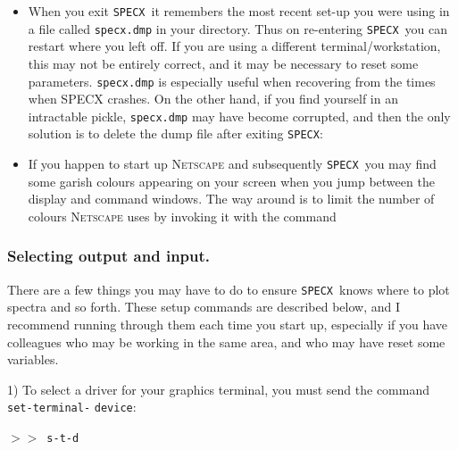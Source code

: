 \documentclass[11pt,twoside]{starlink}
\providecommand{\SPECX}{\texttt{SPECX}}
\providecommand{\SP}{{$>\!>$}}
\begin{document}
\begin{itemize}
\SP\ \verb|$ ls -l *_map.sdf|

Or I could start up \texttt{emacs} in a separate window with the aim of
making command files:

\SP\ \verb|$ emacs &|

The \texttt{\$} sign is an echo of the VMS origins of \SPECX .
\item
When you exit \SPECX\ it remembers the most recent set-up you were
using in a file called \texttt{specx.dmp} in your directory. Thus on
re-entering \SPECX\ you can restart where you left off. If you are
using a different terminal/workstation, this may not be entirely
correct, and it may be necessary to reset some parameters. \texttt{specx.dmp} is especially useful when recovering from the times when
SPECX crashes. On the other hand, if you find yourself in an
intractable pickle, \texttt{specx.dmp} may have become corrupted, and
then the only solution is to delete the dump file after exiting
\SPECX:

\begin{terminalv}
\end{terminalv}

\item
If you happen to start up \textsc{Netscape} and subsequently \SPECX\ you
may find some garish colours appearing on your screen when you jump
between the display and command windows. The way around is to limit
the number of colours \textsc{Netscape} uses by invoking it with the
command

\begin{terminalv}
\end{terminalv}
\end{itemize}

\subsubsection{Selecting output and input.}
\label{sec:preparing-specx}
There are a few things you may have to do to ensure \SPECX\ knows where to
plot spectra and so forth. These setup commands are described below,
and I recommend running through them each time you start up,
especially if you have colleagues who may be working in the same area,
and who may have reset some variables.

1) To select a driver for your graphics terminal, you must send the command
\texttt{set-terminal-} \texttt{device}:

\SP\  \texttt{s-t-d}
\end{document}
